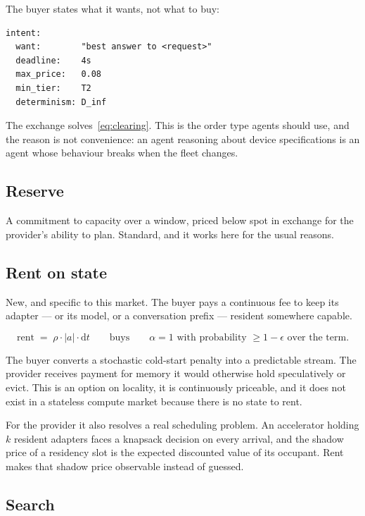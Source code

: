 \documentclass[11pt,a4paper]{article}
\begin{document}
The buyer states what it wants, not what to buy:
\begin{lstlisting}
intent:
  want:        "best answer to <request>"
  deadline:    4s
  max_price:   0.08
  min_tier:    T2
  determinism: D_inf
\end{lstlisting}
The exchange solves~\eqref{eq:clearing}. This is the order type agents should
use, and the reason is not convenience: an agent reasoning about device
specifications is an agent whose behaviour breaks when the fleet changes.

\subsection{Reserve}

A commitment to capacity over a window, priced below spot in exchange for the
provider's ability to plan. Standard, and it works here for the usual reasons.

\subsection{Rent on state}

New, and specific to this market. The buyer pays a continuous fee to keep its
adapter --- or its model, or a conversation prefix --- resident somewhere
capable.

\begin{equation}
\text{rent} \;=\; \rho \cdot |a| \cdot \mathrm{d}t
\qquad\text{buys}\qquad
\alpha = 1 \text{ with probability } \ge 1-\epsilon \text{ over the term.}
\end{equation}

The buyer converts a stochastic cold-start penalty into a predictable stream. The
provider receives payment for memory it would otherwise hold speculatively or
evict. This is an option on locality, it is continuously priceable, and it does
not exist in a stateless compute market because there is no state to rent.

For the provider it also resolves a real scheduling problem. An accelerator
holding $k$ resident adapters faces a knapsack decision on every arrival, and the
shadow price of a residency slot is the expected discounted value of its
occupant. Rent makes that shadow price observable instead of guessed.

\subsection{Search}
\end{document}
